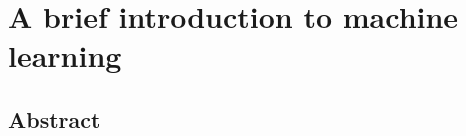\chapter{A brief introduction to machine learning}
\thispagestyle{plain}
\vspace{-.5cm}

\section*{Abstract}
    \dsp
    


